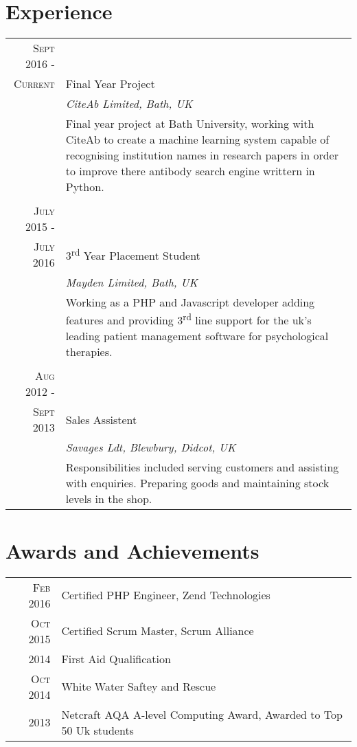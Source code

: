 \documentclass[a4paper,12pt]{article}
\begin{document}
\section{Experience}
\begin{tabular}{rp{11cm}}
\textsc{Sept} 2016 -\\ \textsc{Current} & Final Year Project \\&\emph{CiteAb Limited, Bath, UK}\\&\footnotesize{Final year project at Bath University, working with CiteAb to create a machine learning system capable of recognising institution names
in research papers in order to improve there antibody search engine writtern in Python.}\\\multicolumn{2}{c}{} \\

\textsc{July} 2015 -\\ \textsc{July} 2016 & 3\textsuperscript{rd} Year Placement Student \\&\emph{Mayden Limited, Bath, UK}\\&\footnotesize{Working as a PHP and Javascript developer adding features and providing 3\textsuperscript{rd} line support for the uk's leading patient management software for psychological therapies.}\\\multicolumn{2}{c}{} \\
\textsc{Aug} 2012 -\\ \textsc{Sept} 2013 & Sales Assistent\\&\emph{Savages Ldt, Blewbury, Didcot, UK}\\&\footnotesize{Responsibilities included serving customers and assisting with enquiries. Preparing goods and maintaining stock levels in the shop.  }\\
\end{tabular}

\section{Awards and Achievements}
\begin{tabular}{rl}
 \textsc{Feb} 2016 & Certified PHP Engineer, Zend Technologies\\
 \textsc{Oct} 2015 & Certified Scrum Master, Scrum Alliance\\
 \textsc{} 2014 & First Aid Qualification\\
 \textsc{Oct} 2014 & White Water Saftey and Rescue\\
 \textsc{} 2013 & Netcraft AQA A-level Computing Award, Awarded to Top 50 Uk students\\
\end{tabular}
\end{document}
